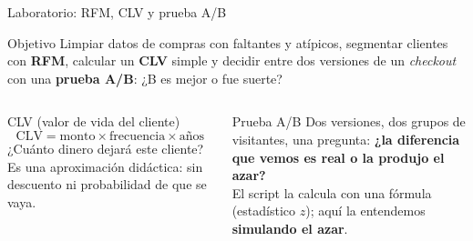 \documentclass[aspectratio=169,xcolor=dvipsnames]{beamer}
\begin{document}
\begin{frame}{Laboratorio: RFM, CLV y prueba A/B}
\begin{block}{Objetivo}
  Limpiar datos de compras con faltantes y atípicos, segmentar clientes con \textbf{RFM}, calcular un \textbf{CLV} simple y decidir entre dos versiones de un \textit{checkout} con una \textbf{prueba A/B}: ¿B es mejor o fue suerte?
\end{block}
\begin{columns}[T]
  \begin{exampleblock}{CLV (valor de vida del cliente)}
    \small
    \[ \mathrm{CLV} = \text{monto} \times \text{frecuencia} \times \text{años} \]
    \scriptsize ¿Cuánto dinero dejará este cliente? Es una aproximación didáctica: sin descuento ni probabilidad de que se vaya.
  \end{exampleblock}
  \begin{block}{Prueba A/B}
    \small Dos versiones, dos grupos de visitantes, una pregunta: \textbf{¿la diferencia que vemos es real o la produjo el azar?}\\[3pt]
    \scriptsize El script la calcula con una fórmula (estadístico $z$); aquí la entendemos \textbf{simulando el azar}.
  \end{block}
\end{columns}
\end{frame}
\end{document}
